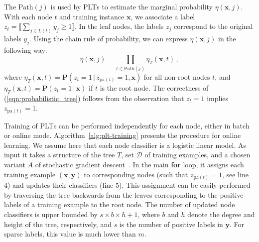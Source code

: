 \documentclass{article}
\newcommand{\Algo}[1]{\textsc{#1}}
\renewcommand{\vec}[1]{\boldsymbol{#1}}
\newcommand{\bx}{\vec{x}}
\newcommand{\by}{\vec{y}}
\newcommand{\calD}{\mathcal{D}}
\newcommand{\heta}{\hat{\eta}}
\newcommand{\pa}[1]{\mathrm{pa}(#1)}
\newcommand{\Path}[1]{\mathrm{Path}(#1)}
\newcommand{\prob}{\mathbf{P}}
\newcommand{\assert}[1]{\llbracket #1 \rrbracket}
\newcommand{\given}{\, | \,}
\begin{document}
The $\Path{j}$ is used by \Algo{PLT}s to estimate the marginal probability $\eta(\bx, j)$.
With each node $t$ and training instance $\bx$, we associate a label $z_t = \assert{\textstyle \sum_{j \in L(t)} y_j \ge 1}$.
In the leaf nodes, the labels $z_j$ correspond to the original labels $y_j$.
Using the chain rule of probability, we can express $\eta(\bx, j)$ in the following way:
\begin{equation}
\eta(\bx, j) = \prod_{t \in \Path{j}} \eta_T(\bx, t)\,,
\label{eqn:probabilistic_tree}
\end{equation}
where $\eta_T(\bx, t) = \prob(z_t = 1 \given z_{\pa{t}} =1, \bx)$ for all non-root nodes $t$, and $\eta_T(\bx, t) = \prob(z_t = 1 \given \bx)$ if $t$ is the root node. 
The correctness of (\ref{eqn:probabilistic_tree}) follows from the observation that $z_{t} = 1$ implies $z_{\pa{t}} = 1$. %

Training of \Algo{PLT}s can be performed independently for each node, either in batch or online mode.  Algorithm~\ref{alg:plt-training} presents the procedure for online learning. We assume here that each node classifier is a logistic linear model. As input it takes a structure of the tree $T$, set $\calD$ of training examples, and a chosen variant $A$ of stochastic gradient descent~\cite{Bottou_2010}. In the main \textbf{for} loop, it assigns each training example $(\bx, \by)$ to corresponding nodes (such that  $z_{\pa{t}} = 1$, see line 4) and updates their classifiers (line 5). This assignment can be easily performed by traversing the tree backwards from the leaves corresponding to the positive labels of a training example to the root node. The number of updated node classifiers is upper bounded by $s \times b \times h+1$, where $b$ and $h$ denote the degree and height of the tree, respectively, and $s$ is the number of positive labels in $\by$. For sparse labels, this value is much lower than $m$.


\end{document}
